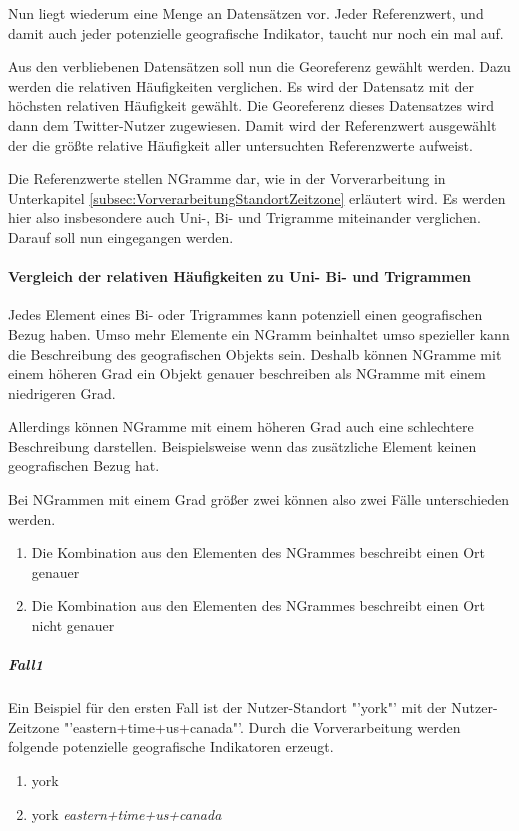 				Nun liegt wiederum eine Menge an Datensätzen vor.
				Jeder Referenzwert, und damit auch jeder potenzielle geografische Indikator, taucht nur noch ein mal auf. 

				Aus den verbliebenen Datensätzen soll nun die Georeferenz gewählt werden. 
				Dazu werden die relativen Häufigkeiten verglichen.
				Es wird der Datensatz mit der höchsten relativen Häufigkeit gewählt.
				Die Georeferenz dieses Datensatzes wird dann dem Twitter-Nutzer zugewiesen. 
				Damit wird der Referenzwert ausgewählt der die größte relative Häufigkeit aller untersuchten Referenzwerte aufweist. 

				Die Referenzwerte stellen NGramme dar, wie in der Vorverarbeitung in Unterkapitel \ref{subsec:VorverarbeitungStandortZeitzone} erläutert wird.
				Es werden hier also insbesondere auch Uni-, Bi- und Trigramme miteinander verglichen.
				Darauf soll nun eingegangen werden.

				\paragraph{Vergleich der relativen Häufigkeiten zu Uni- Bi- und Trigrammen}

					Jedes Element eines Bi- oder Trigrammes kann potenziell einen geografischen Bezug haben. 
					Umso mehr Elemente ein NGramm beinhaltet umso spezieller kann die Beschreibung des geografischen Objekts sein.
					Deshalb können NGramme mit einem höheren Grad ein Objekt genauer beschreiben als NGramme mit einem niedrigeren Grad.

					Allerdings können NGramme mit einem höheren Grad auch eine schlechtere Beschreibung darstellen. 
					Beispielsweise wenn das zusätzliche Element keinen geografischen Bezug hat.

					Bei NGrammen mit einem Grad größer zwei können also zwei Fälle unterschieden werden.

					\begin{enumerate}
						\item Die Kombination aus den Elementen des NGrammes beschreibt einen Ort genauer
						\item Die Kombination aus den Elementen des NGrammes beschreibt einen Ort nicht genauer
					\end{enumerate}

					\subparagraph{Fall1} 

						Ein Beispiel für den ersten Fall ist der Nutzer-Standort "'york"' mit der Nutzer-Zeitzone "'eastern+time+us+canada"'. 
						Durch die Vorverarbeitung werden folgende potenzielle geografische Indikatoren erzeugt.
						\begin{enumerate}		
							\item york
							\item york \textit{eastern+time+us+canada}
						\end{enumerate}		


